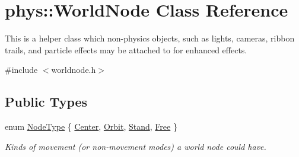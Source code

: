 \hypertarget{classphys_1_1WorldNode}{
\section{phys::WorldNode Class Reference}
\label{d2/d3e/classphys_1_1WorldNode}
}


This is a helper class which non-\/physics objects, such as lights, cameras, ribbon trails, and particle effects may be attached to for enhanced effects.  




{\ttfamily \#include $<$worldnode.h$>$}

\subsection*{Public Types}
\begin{DoxyCompactItemize}
\item 
enum \hyperlink{classphys_1_1WorldNode_a0b178b06aa411b00c4c2ccd926d9bf5a}{NodeType} \{ \hyperlink{classphys_1_1WorldNode_a0b178b06aa411b00c4c2ccd926d9bf5aa06be3334346d6ba7913197ee0dd5b8bb}{Center}, 
\hyperlink{classphys_1_1WorldNode_a0b178b06aa411b00c4c2ccd926d9bf5aae9751e5fc4396425fbd7b93171541a22}{Orbit}, 
\hyperlink{classphys_1_1WorldNode_a0b178b06aa411b00c4c2ccd926d9bf5aa2ae400375e79106ae01adf39dd5c1185}{Stand}, 
\hyperlink{classphys_1_1WorldNode_a0b178b06aa411b00c4c2ccd926d9bf5aaa4f848b95586fc581aa1f749c82a1fb5}{Free}
 \}
\begin{DoxyCompactList}\small\item\em Kinds of movement (or non-\/movement modes) a world node could have. \item\end{DoxyCompactList}\end{DoxyCompactItemize}
